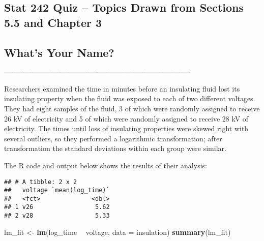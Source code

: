 \documentclass[]{article}
\title{}
\author{}
\date{}
\newenvironment{Shaded}{\begin{snugshade}}{\end{snugshade}}
\newcommand{\DataTypeTok}[1]{\textcolor[rgb]{0.13,0.29,0.53}{#1}}
\newcommand{\KeywordTok}[1]{\textcolor[rgb]{0.13,0.29,0.53}{\textbf{#1}}}
\newcommand{\NormalTok}[1]{#1}
\newcommand{\OperatorTok}[1]{\textcolor[rgb]{0.81,0.36,0.00}{\textbf{#1}}}
\newcommand{\StringTok}[1]{\textcolor[rgb]{0.31,0.60,0.02}{#1}}
\begin{document}
\hypertarget{stat-242-quiz-topics-drawn-from-sections-5.5-and-chapter-3}{%
\subsection{Stat 242 Quiz -- Topics Drawn from Sections 5.5 and Chapter
3}\label{stat-242-quiz-topics-drawn-from-sections-5.5-and-chapter-3}}

\hypertarget{whats-your-name-____________________}{%
\subsection{What's Your Name?
\_\_\_\_\_\_\_\_\_\_\_\_\_\_\_\_\_\_\_\_}\label{whats-your-name-____________________}}

Researchers examined the time in minutes before an insulating fluid lost
its insulating property when the fluid was exposed to each of two
different voltages. They had eight samples of the fluid, 3 of which were
randomly assigned to receive 26 kV of electricity and 5 of which were
randomly assigned to receive 28 kV of electricity. The times until loss
of insulating properties were skewed right with several outliers, so
they performed a logarithmic transformation; after transformation the
standard deviations within each group were similar.

The R code and output below shows the results of their analysis:

\begin{Shaded}
\end{Shaded}

\begin{verbatim}
## # A tibble: 2 x 2
##   voltage `mean(log_time)`
##   <fct>              <dbl>
## 1 v26                 5.62
## 2 v28                 5.33
\end{verbatim}

\begin{Shaded}
\begin{Highlighting}[]
\NormalTok{lm_fit <-}\StringTok{ }\KeywordTok{lm}\NormalTok{(log_time }\OperatorTok{~}\StringTok{ }\NormalTok{voltage, }\DataTypeTok{data =}\NormalTok{ insulation)}
\KeywordTok{summary}\NormalTok{(lm_fit)}
\end{Highlighting}
\end{Shaded}
\end{document}
